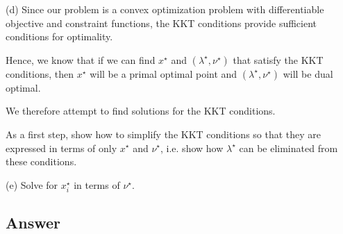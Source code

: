 \documentclass[
	12pt,
]{fphw}
\begin{document}
(d) Since our problem is a convex optimization problem with differentiable objective and constraint functions,
the KKT conditions provide sufficient conditions for optimality.

Hence, we know that if we can find \(x^\star\) and \((\lambda^\star, \nu^\star)\) that satisfy the KKT conditions,
then \(x^\star\) will be a primal optimal point and \((\lambda^\star, \nu^\star)\) will be dual optimal.

We therefore attempt to find solutions for the KKT conditions.

As a first step, show how to simplify the KKT conditions so that they are expressed in terms of only \(x^\star\) and \(\nu^\star\),
i.e. show how \(\lambda^\star\) can be eliminated from these conditions.

(e) Solve for \(x_i^\star\) in terms of \(\nu^\star\).

\subsection*{Answer}
\end{document}
